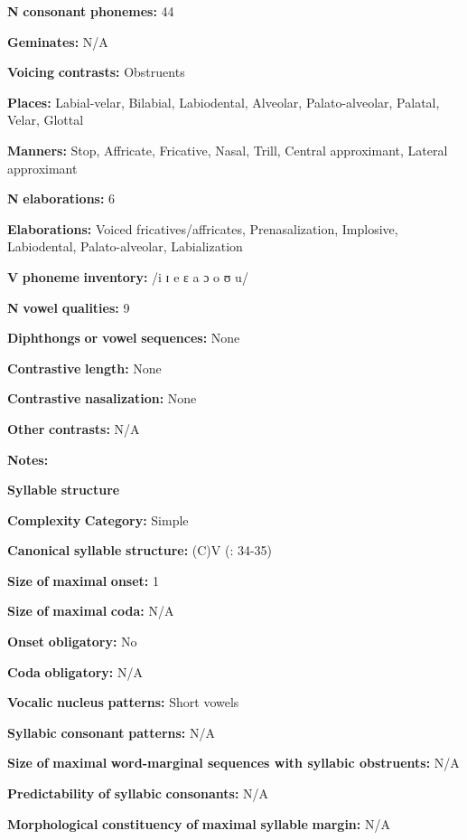 \textbf{N} \textbf{consonant} \textbf{phonemes:} 44

\textbf{Geminates:} N/A

\textbf{Voicing} \textbf{contrasts:} Obstruents

\textbf{Places:} Labial-velar, Bilabial, Labiodental, Alveolar, Palato-alveolar, Palatal, Velar, Glottal

\textbf{Manners:} Stop, Affricate, Fricative, Nasal, Trill, Central approximant, Lateral approximant

\textbf{N} \textbf{elaborations:} 6

\textbf{Elaborations:} Voiced fricatives/affricates, Prenasalization, Implosive, Labiodental, Palato-alveolar, Labialization

\textbf{V} \textbf{phoneme} \textbf{inventory:} /i ɪ e ɛ a ɔ o ʊ u/

\textbf{N} \textbf{vowel} \textbf{qualities:} 9

\textbf{Diphthongs} \textbf{or} \textbf{vowel} \textbf{sequences:} None

\textbf{Contrastive} \textbf{length:} None

\textbf{Contrastive} \textbf{nasalization:} None

\textbf{Other} \textbf{contrasts:} N/A

\textbf{Notes:}

\textbf{Syllable} \textbf{structure}

\textbf{Complexity} \textbf{Category:} Simple

\textbf{Canonical} \textbf{syllable} \textbf{structure:} (C)V (\citealt{BlackingsFabb2003}: 34-35)

\textbf{Size} \textbf{of} \textbf{maximal} \textbf{onset:} 1

\textbf{Size} \textbf{of} \textbf{maximal} \textbf{coda:} N/A

\textbf{Onset} \textbf{obligatory:} No

\textbf{Coda} \textbf{obligatory:} N/A

\textbf{Vocalic} \textbf{nucleus} \textbf{patterns:} Short vowels

\textbf{Syllabic} \textbf{consonant} \textbf{patterns:} N/A

\textbf{Size} \textbf{of} \textbf{maximal} \textbf{word{}-marginal sequences with syllabic obstruents:} N/A

\textbf{Predictability} \textbf{of} \textbf{syllabic} \textbf{consonants:} N/A

\textbf{Morphological} \textbf{constituency} \textbf{of} \textbf{maximal} \textbf{syllable} \textbf{margin:} N/A

